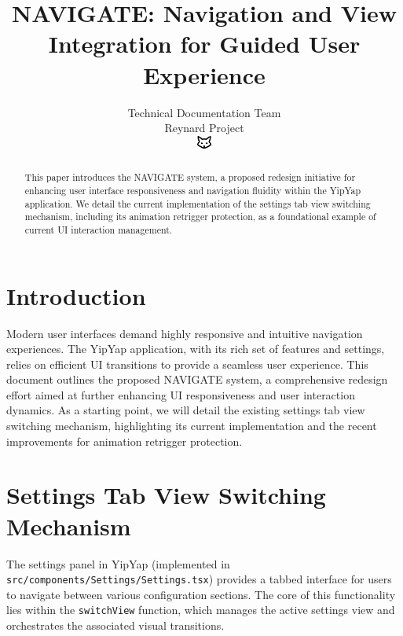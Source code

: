 \documentclass[10pt]{article}
\begin{document}
\title{NAVIGATE: Navigation and View Integration for Guided User Experience}

\author{Technical Documentation Team\\
Reynard Project\\
\includegraphics[width=0.5cm]{../../shared-assets/favicon.pdf}}

\maketitle

\begin{abstract}
This paper introduces the NAVIGATE system, a proposed redesign initiative for enhancing user interface responsiveness and navigation fluidity within the YipYap application. We detail the current implementation of the settings tab view switching mechanism, including its animation retrigger protection, as a foundational example of current UI interaction management.
\end{abstract}

\section{Introduction}

Modern user interfaces demand highly responsive and intuitive navigation experiences. The YipYap application, with its rich set of features and settings, relies on efficient UI transitions to provide a seamless user experience. This document outlines the proposed NAVIGATE system, a comprehensive redesign effort aimed at further enhancing UI responsiveness and user interaction dynamics. As a starting point, we will detail the existing settings tab view switching mechanism, highlighting its current implementation and the recent improvements for animation retrigger protection.

\section{Settings Tab View Switching Mechanism}

The settings panel in YipYap (implemented in \texttt{src/components/Settings/Settings.tsx}) provides a tabbed interface for users to navigate between various configuration sections. The core of this functionality lies within the \texttt{switchView} function, which manages the active settings view and orchestrates the associated visual transitions.
\end{document}
